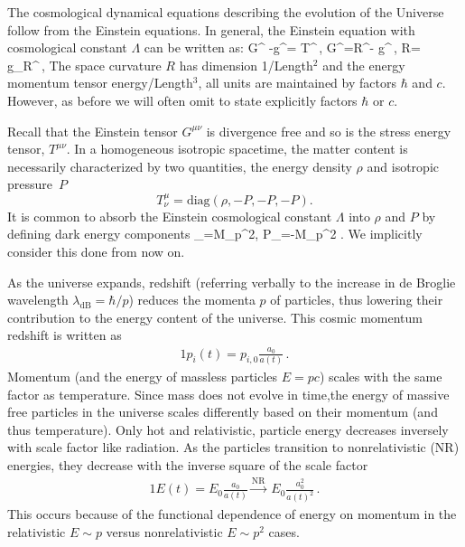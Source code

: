 The cosmological dynamical equations describing the evolution of the Universe follow from the Einstein equations. In general, the Einstein equation with cosmological constant $\Lambda$ can be written as:
\beqn\label{Einstine}
G^{\mu\nu} -\Lambda g^{\mu\nu}= T^{\mu\nu}\,, \quad G^{\mu\nu}=R^{\mu\nu}- g^{\mu\nu}\,,
\quad R= g_{\mu\nu}R^{\mu\nu}\,,
\eeqn
The space curvature $R$ has dimension 1/Length$^2$ and the energy momentum tensor energy/Length$^3$, all units are maintained by factors $\hbar$ and $c$. However, as before we will often omit to state explicitly factors $\hbar$ or $c$.

Recall that the Einstein tensor $G^{\mu\nu}$ is divergence free and so is the stress energy tensor, $T^{\mu\nu}$. In a homogeneous isotropic spacetime, the matter content is necessarily characterized by two quantities, the energy density $\rho$ and isotropic pressure~$P$
\begin{equation}
 T^\mu_\nu =\mathrm{diag}(\rho, -P, -P, -P).
\end{equation}
 It is common to absorb the Einstein cosmological constant $\Lambda$ into $\rho$ and $P$ by defining dark energy components
\beqn\label{EpsLam}
\rho_\Lambda=M_p^2\Lambda, \qquad P_\Lambda=-M_p^2 \Lambda.
\eeqn
We implicitly consider this done from now on. 

As the universe expands, redshift (referring verbally to the increase in de Broglie wavelength $\lambda_\mathrm{dB}=\hbar /p$) reduces the momenta $p$ of particles, thus lowering their contribution to the energy content of the universe. This cosmic momentum redshift is written as
\begin{alignat}{1}
 \label{Redshift} p_{i}(t) = p_{i,0}\frac{a_{0}}{a(t)}\,.
\end{alignat}
Momentum (and the energy of massless particles $E=pc$) scales with the same factor as temperature. Since mass does not evolve in time,the energy of massive free particles in the universe scales differently based on their momentum (and thus temperature). Only hot and relativistic, particle energy decreases inversely with scale factor like radiation. As the particles transition to nonrelativistic (NR) energies, they decrease with the inverse square of the scale factor
\begin{alignat}{1}
 \label{EScale} E(t) = E_{0}\frac{a_{0}}{a(t)}\xrightarrow{\mathrm{NR}}\ E_{0}\frac{a_{0}^{2}}{a(t)^{2}}\,.
\end{alignat}
This occurs because of the functional dependence of energy on momentum in the relativistic $E\sim p$ versus nonrelativistic $E\sim p^{2}$ cases.



